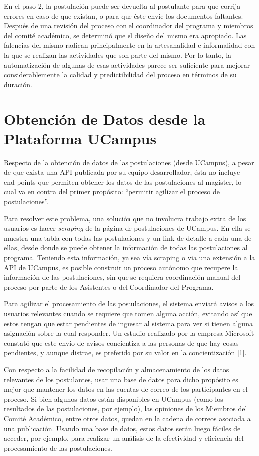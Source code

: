 En el paso 2, la postulación puede ser devuelta al postulante para que corrija
errores en caso de que existan, o para que éste envíe los documentos faltantes.
Después de una revisión del proceso con el coordinador del programa y miembros
del comité académico, se determinó que el diseño del mismo era apropiado. Las
falencias del mismo radican principalmente en la artesanalidad e informalidad
con la que se realizan las actividades que son parte del mismo. Por lo tanto, la
automatización de algunas de esas actividades parece ser suficiente para mejorar
considerablemente la calidad y predictibilidad del proceso en términos de su
duración.

\section{Obtención de Datos desde la Plataforma UCampus}

Respecto de la obtención de datos de las postulaciones (desde UCampus), a pesar
de que exista una API publicada por su equipo desarrollador, ésta no incluye
end-points que permiten obtener los datos de las postulaciones al magíster, lo
cual va en contra del primer propósito: “permitir agilizar el proceso de
postulaciones”. 

Para resolver este problema, una solución que no involucra trabajo extra de los
usuarios es hacer \emph{scraping} de la página de postulaciones de UCampus. En
ella se muestra una tabla con todas las postulaciones y un link de detalle a
cada una de ellas, desde donde se puede obtener la información de todas las
postulaciones al programa. Teniendo esta información, ya sea vía scraping o via
una extensión a la API de UCampus, es posible construir un proceso autónomo que
recupere la información de las postulaciones, sin que se requiera coordinación
manual del proceso por parte de los Asistentes o del Coordinador del Programa.

Para agilizar el procesamiento de las postulaciones, el sistema enviará avisos a
los usuarios relevantes cuando se requiere que tomen alguna acción, evitando así
que estos tengan que estar pendientes de ingresar al sistema para ver si tienen
alguna asignación sobre la cual responder. Un estudio realizado por la empresa
Microsoft constató que este envío de avisos concientiza a las personas de que
hay cosas pendientes, y aunque distrae, es preferido por su valor en la
concientización [1].

Con respecto a la facilidad de recopilación y almacenamiento de los datos
relevantes de los postulantes, usar una base de datos para dicho propósito es
mejor que mantener los datos en las cuentas de correo de los participantes en el
proceso. Si bien algunos datos están disponibles en UCampus (como los resultados
de las postulaciones, por ejemplo), las opiniones de los Miembros del Comité
Académico, entre otros datos, quedan en la cadena de correos asociada a una
publicación. Usando una base de datos, estos datos serán luego fáciles de
acceder, por ejemplo, para realizar un análisis de la efectividad y eficiencia
del procesamiento de las postulaciones.

